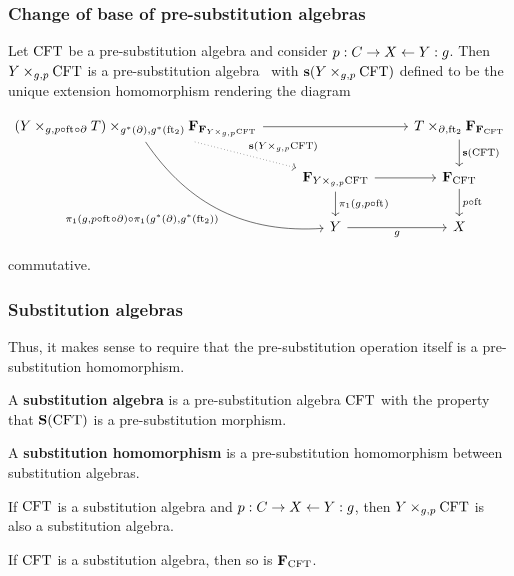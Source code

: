 \documentclass[handout]{beamer}
\newcommand\important[1]{\textbf{\color{red!90!black}#1}}
\begin{document}
\begin{frame}
\frametitle{\bf Change of base of pre-substitution algebras}
\begin{theorem}
Let $\mathrm{CFT}$ be a pre-substitution algebra and consider
$p:C\rightarrow X\leftarrow Y:g$. Then
$\cobesys{Y}{\stesys}{g}{p}$ is a pre-substitution algebra
\pause~with $\mathbf{s}(\cobesys{Y}{\stesys}{g}{p})$ defined
to be the unique extension homomorphism rendering the diagram
\begin{footnotesize}
\begin{equation*}
\begin{tikzcd}[ampersand replacement=\&]
\cobesys
  {\pullback{Y}{\stesyst}{g}{p\circ\eft\circ\ebd}}
  {\famesys{\famesys{\cobesys{Y}{\stesys}{g}{p}}}}
  {g^\ast(\ebd)}{g^\ast(\eft[2])}
  \ar[dotted]{dr}{\mathbf{s}(\cobesys{Y}{\stesys}{g}{p})}
  \ar{rr}
  \ar[bend right]{ddr}[swap]%
    { \pullbackpr{1}{g}{p\circ\eft\circ\ebd}%
        \circ%
      \pullbackpr{1}{g^\ast(\ebd)}{g^\ast(\eft[2])}%
      }
  \&
  {}\&
\cobesys{\stesyst}{\famesys{\famesys{\stesys}}}{\ebd}{\eft[2]}
  \ar{d}{\mathbf{s}(\stesys)}
  \\
  {}\&
\famesys{\cobesys{Y}{\stesys}{g}{p}}
  \ar{r}
  \ar{d}{\pullbackpr{1}{g}{p\circ\eft}}
  \&
\famesys{\stesys}
  \ar{d}{p\circ\eft}
  \\
  {}\&
Y
  \ar{r}[swap]{g}
  \&
X
\end{tikzcd}
\end{equation*}
\end{footnotesize}
commutative. 
\end{theorem}
\end{frame}

\begin{frame}
\frametitle{\bf Substitution algebras}
Thus, it makes sense to require that the pre-substitution operation itself is a
pre-substitution homomorphism.
\begin{definition}
A \important{substitution algebra} is a pre-substitution algebra $\mathrm{CFT}$ with the property that
$\mathbf{S}(\mathrm{CFT})$ is a pre-substitution morphism.
\end{definition}
\pause
\begin{definition}
A \important{substitution homomorphism} is a pre-substitution homomorphism between substitution
algebras.
\end{definition}
\pause
\begin{theorem}
If $\mathrm{CFT}$ is a substitution algebra and $p:C\rightarrow X\leftarrow Y:g$,
then $\cobesys{Y}{\stesys}{g}{p}$ is also a substitution algebra.
\end{theorem}
\pause
\begin{theorem}
If $\mathrm{CFT}$ is a substitution algebra, then so is $\mathbf{F}_{\mathrm{CFT}}$. 
\end{theorem}
\end{frame}
\end{document}
